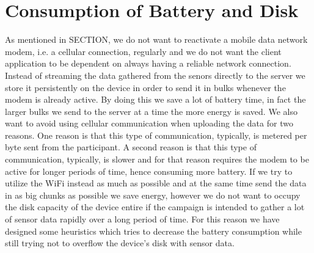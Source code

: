 \section{Consumption of Battery and Disk}

As mentioned in SECTION, we do not want to reactivate a mobile data network modem, i.e. a cellular connection, regularly and we do not want the client application to be dependent on always having a reliable network connection. Instead of streaming the data gathered from the senors directly to the server we store it persistently on the device in order to send it in bulks whenever the modem is already active. By doing this we save a lot of battery time, in fact the larger bulks we send to the server at a time the more energy is saved. We also want to avoid using cellular communication when uploading the data for two reasons. One reason is that this type of communication, typically, is metered per byte sent from the participant. A second reason is that this type of communication, typically, is slower and for that reason requires the modem to be active for longer periods of time, hence consuming more battery. If we try to utilize the WiFi instead as much as possible and at the same time send the data in as big chunks as possible we save energy, however we do not want to occupy the disk capacity of the device entire if the campaign is intended to gather a lot of sensor data rapidly over a long period of time. For this reason we have designed some heuristics which tries to decrease the battery consumption while still trying not to overflow the device's disk with sensor data.

